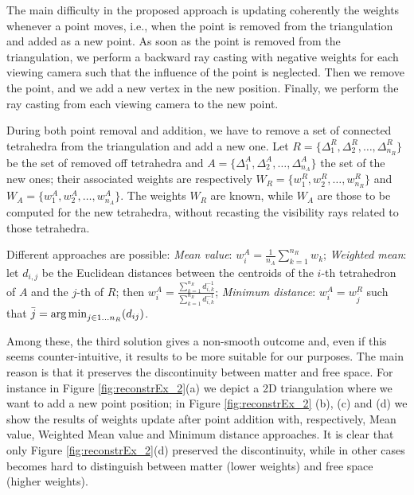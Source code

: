 The main difficulty in the proposed approach is updating coherently the weights whenever a point moves, i.e., when the point is removed from the triangulation and added as a new point. As soon as the point is removed from the triangulation, we perform a backward ray casting with negative weights for each viewing camera such that the influence of the point is neglected. Then we remove the point, and we add a new vertex in the new position. Finally, we perform the ray casting from each viewing camera to the new point.

During both point removal and addition, we have to remove a set of connected tetrahedra from the triangulation and add a new one. 
Let $R = \{\Delta_1^R, \Delta_2^R, \dots, \Delta_{n_R}^R\}$ be the set of removed off tetrahedra and $A = \{\Delta_1^A, \Delta_2^A, \dots, \Delta_{n_A}^A\}$ the set of the new ones; their associated weights are respectively $W_R = \{w_1^R, w_2^R, \dots, w_{n_R}^R\}$ and $W_A = \{w_1^A, w_2^A, \dots, w_{n_A}^A\}$. The weights $W_R$ are known, while $W_A$ are those to be computed for the new tetrahedra, without recasting the visibility rays related to those tetrahedra.

Different approaches are possible: \emph{Mean value}: $w_i^A = \frac{1}{n_A}\sum_{k=1}^{n_R} w_{k}$; \emph{Weighted mean}: let $d_{i,j}$ be the Euclidean distances between the centroids of the $i$-th tetrahedron of $A$ and the $j$-th of $R$; then $w_i^A = \frac{\sum_{k=1}^{n_R}d_{i,k}^{-1}}{\sum_{k=1}^{n_R}d_{i,k}^{-1}}$; \emph{Minimum distance}: $w_i^A = w_{\bar{j}}^R$ such that $\bar{j} = \operatorname*{arg\,min}_{j \in {1\dots n_R}}(d_{ij})$.

Among these, the third solution gives a non-smooth outcome and, even if this seems counter-intuitive, it results to be more suitable for our purposes. The main reason is that it preserves the discontinuity between matter and free space. For instance in Figure \ref{fig:reconstrEx_2}(a) we depict a 2D triangulation where we want to add a new point position; in Figure \ref{fig:reconstrEx_2} (b), (c) and (d) we show the results of weights update after point addition with, respectively, Mean value, Weighted Mean value and Minimum distance approaches. 
It is clear that only Figure \ref{fig:reconstrEx_2}(d) preserved the discontinuity, while in other cases becomes hard to distinguish between matter (lower weights) and free space (higher weights). 



